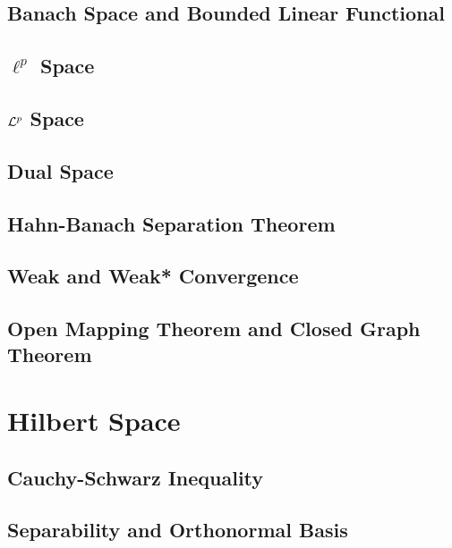 \documentclass[a4paper, 12pt]{article}
\begin{document}
\subsection{Banach Space and Bounded Linear Functional}


\subsection{$\ell^p$ Space}


\subsection{$\mathcal{L}^p$ Space}


\subsection{Dual Space}


\subsection{Hahn-Banach Separation Theorem}


\subsection{Weak and Weak* Convergence}


\subsection{Open Mapping Theorem and Closed Graph Theorem}


\newpage
\section{Hilbert Space}

\subsection{Cauchy-Schwarz Inequality}


\subsection{Separability and Orthonormal Basis}

\end{document}
